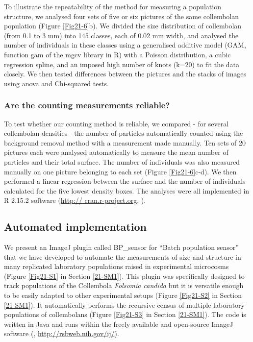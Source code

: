 To illustrate the repeatability of the method for measuring a population
structure, we analysed four sets of five or six pictures of the same collembolan
population (Figure \ref{Fig21-6}b). We divided the size distribution of collembolan (from
0.1 to 3 mm) into 145 classes, each of 0.02 mm width, and analysed the number of
individuals in these classes using a generalised additive model (GAM, function
gam of the mgcv library in R) with a Poisson distribution, a cubic regression
spline, and an imposed high number of knots (k=20) to fit the data closely. We
then tested differences between the pictures and the stacks of images using
anova and Chi-squared tests.

\subsubsection{Are the counting measurements reliable?}

To test whether our counting method is reliable, we compared - for several
collembolan densities - the number of particles automatically counted using the
background removal method with a measurement made manually. Ten sets of 20
pictures each were analysed automatically to measure the mean number of
particles and their total surface. The number of individuals was also measured
manually on one picture belonging to each set (Figure \ref{Fig21-6}c-d). We then performed a
linear regression between the surface and the number of individuals calculated
for the five lowest density boxes. The analyses were all implemented in R 2.15.2
software (\url{http:// cran.r-project.org}, \citealp{ihaka1996a}).

\subsection{Automated implementation}

We present an ImageJ plugin called BP\_sensor for “Batch population sensor” that
we have developed to automate the measurements of size and structure in many
replicated laboratory populations raised in experimental microcosms (Figure \ref{Fig21-S1}
in Section \ref{21-SM1}). This plugin was specifically designed to track populations of the
Collembola \textit{Folsomia candida} but it is versatile enough to be easily adapted to
other experimental setups (Figure \ref{Fig21-S2} in Section \ref{21-SM1}). It automatically performs the
recursive census of multiple laboratory populations of collembolans (Figure \ref{Fig21-S3}
in Section \ref{21-SM1}). The code is written in Java and runs within the freely available
and open-source ImageJ software (\citealp{abramoff2004a}, 
\url{http://rsbweb.nih.gov/ij/}).

